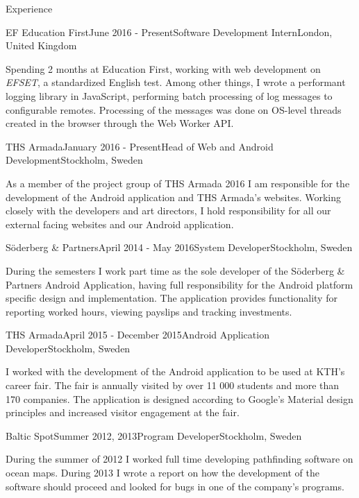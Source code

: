 \documentclass{resume} %
\begin{document}
\begin{rSection}{Experience}

\begin{rSubsection}{EF Education First}{June 2016 - Present}{Software Development Intern}{London, United Kingdom}
\item Spending 2 months at Education First, working with web development on \textit{EFSET}, a standardized English test. Among other things, I wrote a performant logging library in JavaScript, performing batch processing of log messages to configurable remotes. Processing of the messages was done on OS-level threads created in the browser through the Web Worker API.
\end{rSubsection}

\begin{rSubsection}{THS Armada}{January 2016 - Present}{Head of Web and Android Development}{Stockholm, Sweden}
\item As a member of the project group of THS Armada 2016 I am responsible for the development of the Android application and THS Armada's websites. Working closely with the developers and art directors, I hold responsibility for all our external facing websites and our Android application.
\end{rSubsection}

\begin{rSubsection}{Söderberg \& Partners}{April 2014 - May 2016}{System Developer}{Stockholm, Sweden}
\item During the semesters I work part time as the sole developer of the Söderberg \& Partners Android Application, having full responsibility for the Android platform specific design and implementation. The application provides functionality for reporting worked hours, viewing payslips and tracking investments.
\end{rSubsection}

\begin{rSubsection}{THS Armada}{April 2015 - December 2015}{Android Application Developer}{Stockholm, Sweden}
\item I worked with the development of the Android application to be used at KTH's career fair. The fair is annually visited by over 11 000 students and more than 170 companies. The application is designed according to Google's Material design principles and increased visitor engagement at the fair.
\end{rSubsection}

\begin{rSubsection}{Baltic Spot}{Summer 2012, 2013}{Program Developer}{Stockholm, Sweden}
\item During the summer of 2012 I worked full time developing pathfinding software on ocean maps. During 2013 I wrote a report on how the development of the software should proceed and looked for bugs in one of the company's programs.
\end{rSubsection}

\end{rSection}
\end{document}
